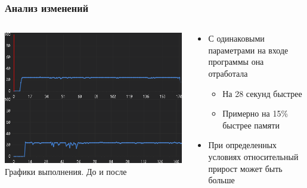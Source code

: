\documentclass[10pt]{beamer}
\begin{document}
\begin{frame}
\frametitle{Анализ изменений}


\begin{columns}[c]

\begin{center}
  \includegraphics[width=\textwidth]{res/img/AnalysisTargetWizardTestCropped.png}
  Графики выполнения. До и после
\end{center}

\begin{block}{}
  \begin{itemize}
    \item С одинаковыми параметрами на входе программы она отработала
    \begin{itemize}
      \item На 28 секунд быстрее
      \item Примерно на 15\% быстрее памяти
    \end{itemize}
    \item При определенных условиях относительный прирост может быть больше
  \end{itemize}
\end{block}

\end{columns}

\end{frame}
\end{document}
